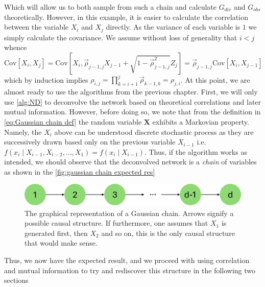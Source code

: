 \documentclass[../Thesis.tex]{subfiles}
\begin{document}
Which will allow us to both sample from such a chain and calculate $G_{dir}$ and $G_{obs}$ theoretically. However, in this example, it is easier to calculate the correlation between the variable $X_i$ and $X_j$ directly. As the variance of each variable is $1$ we simply calculate the covariance. We assume without loss of generality that $i < j$ whence
$$\text{Cov}\left[X_i, X_j\right] = \text{Cov}\left[X_i, \vec{\rho}_{j-1,j} X_{j-1} + \sqrt{1 - \vec{\rho}_{j-1,j}^2}Z_j\right] = \vec{\rho}_{j-1,j} \text{Cov}\left[X_i, X_{j-1}\right]$$
which by induction implies $\rho_{i,j} = \prod_{k=i+1}^{j} \vec{\rho}_{k-1,k} = \rho_{j,i}$. At this point, we are almost ready to use the algorithms from the previous chapter. First, we will only use \autoref{alg:ND} to deconvolve the network based on theoretical correlations and later mutual information. However, before doing so, we note that from the definition in \autoref{eq:Gaussian chain def} the random variable $\boldsymbol X$ exhibits a Markovian property. Namely, the $X_i$ above can be understood discrete stochastic process as they are successively drawn based only on the previous variable $X_{i-1}$ i.e. $f\left(x_i \mid X_{i-1}, X_{i-2} , \dots , X_{1}\right) = f\left(x_i \mid X_{i-1}\right)$. Thus, if the algorithm works as intended, we should observe that the deconvolved network is a \textit{chain} of variables as shown in the \autoref{fig:gaussian chain expected res}
\begin{figure}[ht]
    \centering
    \includegraphics[width = .7\linewidth]{figures/ND examples/Gaussian chain.png}
    \caption{The graphical representation of a Gaussian chain. Arrows signify a possible causal structure. If furthermore, one assumes that $X_1$ is generated first, then $X_2$ and so on, this is the only causal structure that would make sense.}
    \label{fig:gaussian chain expected res}
\end{figure}
Thus, we now have the expected result, and we proceed with using correlation and mutual information to try and rediscover this structure in the following two sections
\end{document}
